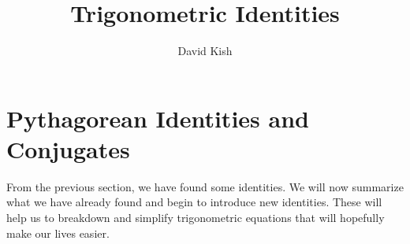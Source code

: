 \documentclass{ximera}
\author{David Kish}
\title{Trigonometric Identities}
\begin{document}
\begin{abstract}
  
\end{abstract}
\maketitle

\section{Pythagorean Identities and Conjugates}
From the previous section, we have found some identities. We will now summarize what we have already found and begin to introduce new identities. These will help us to breakdown and simplify trigonometric equations that will hopefully make our lives easier.
\end{document}
